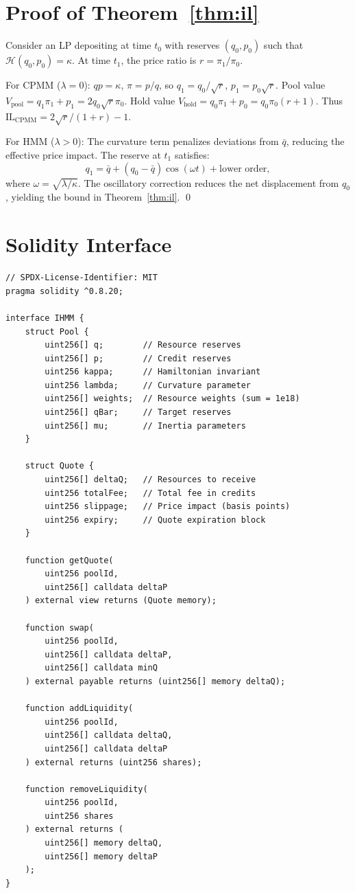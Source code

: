 \documentclass[11pt,twocolumn]{article}
\begin{document}
\appendix

\section{Proof of Theorem~\ref{thm:il}}
\label{app:il_proof}

Consider an LP depositing at time $t_0$ with reserves $(q_0, p_0)$ such that $\mathcal{H}(q_0, p_0) = \kappa$. At time $t_1$, the price ratio is $r = \pi_1/\pi_0$.

For CPMM ($\lambda = 0$): $qp = \kappa$, $\pi = p/q$, so $q_1 = q_0/\sqrt{r}$, $p_1 = p_0\sqrt{r}$. Pool value $V_{\text{pool}} = q_1\pi_1 + p_1 = 2q_0\sqrt{r}\pi_0$. Hold value $V_{\text{hold}} = q_0\pi_1 + p_0 = q_0\pi_0(r + 1)$. Thus $\text{IL}_{\text{CPMM}} = 2\sqrt{r}/(1+r) - 1$.

For HMM ($\lambda > 0$): The curvature term penalizes deviations from $\bar{q}$, reducing the effective price impact. The reserve at $t_1$ satisfies:
\begin{equation}
q_1 = \bar{q} + (q_0 - \bar{q}) \cos(\omega t) + \text{lower order},
\end{equation}
where $\omega = \sqrt{\lambda/\kappa}$. The oscillatory correction reduces the net displacement from $q_0$, yielding the bound in Theorem~\ref{thm:il}. \qed

\section{Solidity Interface}
\label{app:solidity}

\begin{verbatim}
// SPDX-License-Identifier: MIT
pragma solidity ^0.8.20;

interface IHMM {
    struct Pool {
        uint256[] q;        // Resource reserves
        uint256[] p;        // Credit reserves
        uint256 kappa;      // Hamiltonian invariant
        uint256 lambda;     // Curvature parameter
        uint256[] weights;  // Resource weights (sum = 1e18)
        uint256[] qBar;     // Target reserves
        uint256[] mu;       // Inertia parameters
    }

    struct Quote {
        uint256[] deltaQ;   // Resources to receive
        uint256 totalFee;   // Total fee in credits
        uint256 slippage;   // Price impact (basis points)
        uint256 expiry;     // Quote expiration block
    }

    function getQuote(
        uint256 poolId,
        uint256[] calldata deltaP
    ) external view returns (Quote memory);

    function swap(
        uint256 poolId,
        uint256[] calldata deltaP,
        uint256[] calldata minQ
    ) external payable returns (uint256[] memory deltaQ);

    function addLiquidity(
        uint256 poolId,
        uint256[] calldata deltaQ,
        uint256[] calldata deltaP
    ) external returns (uint256 shares);

    function removeLiquidity(
        uint256 poolId,
        uint256 shares
    ) external returns (
        uint256[] memory deltaQ,
        uint256[] memory deltaP
    );
}
\end{verbatim}
\end{document}
